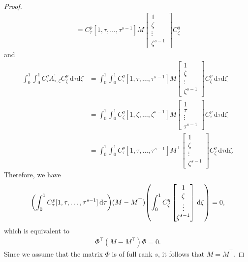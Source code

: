 \documentclass[final,leqno,onefignum,onetabnum]{siamltex1213}
\DeclarePairedDelimiter\paren{\lparen}{\rparen}
\begin{document}
\begin{proof}
\begin{align*}
=
C_\tau^p [1,\tau , \dots ,\tau ^{s-1}] M 
\begin{bmatrix}
1 \\ \zeta \\ \vdots \\ \zeta^{s-1}
\end{bmatrix} C_\zeta^q
\end{align*}
and 
\begin{align*}
\int_0^1 \int_0^1 C_\tau^q A_{\tau,\zeta}^\prime C_\zeta^p \,{\mathrm d}\tau{\mathrm d}\zeta 
& =
\int_0^1 \int_0^1
C_\tau^q [1,\tau , \dots ,\tau ^{s-1}] M 
\begin{bmatrix}
1 \\ \zeta \\ \vdots \\ \zeta^{s-1}
\end{bmatrix} C_\zeta^p \,{\mathrm d}\tau{\mathrm d}\zeta \\
& =
\int_0^1 \int_0^1
C_\zeta^q [1,\zeta , \dots ,\zeta ^{s-1}] M 
\begin{bmatrix}
1 \\ \tau \\ \vdots \\ \tau^{s-1}
\end{bmatrix} C_\tau^p \,{\mathrm d}\tau{\mathrm d}\zeta \\
& =
\int_0^1 \int_0^1
C_\tau^p [1,\tau , \dots ,\tau ^{s-1}] M ^\top
\begin{bmatrix}
1 \\ \zeta \\ \vdots \\ \zeta^{s-1}
\end{bmatrix} C_\zeta^q \,{\mathrm d}\tau{\mathrm d}\zeta.
\end{align*}
Therefore, we have
\begin{align} 
\paren*{\int_0^1 C_\tau^p [1,\tau , \dots ,\tau ^{s-1}] \,{\mathrm d} \tau}
(M-M^\top)
\paren*{\int_0^1 C_\zeta^q \begin{bmatrix}
1 \\ \zeta \\ \vdots \\ \zeta^{s-1}
\end{bmatrix} \,{\mathrm d} \zeta}
=0, \label{eq:pmp}
\end{align}
which is equivalent to
\begin{align*}
\Phi^\top (M-M^\top) \Phi = 0.
\end{align*}
Since we assume that
the matrix $\Phi$ is of full rank $s$,
it follows that $M=M^\top$. 
\end{proof}
\end{document}

